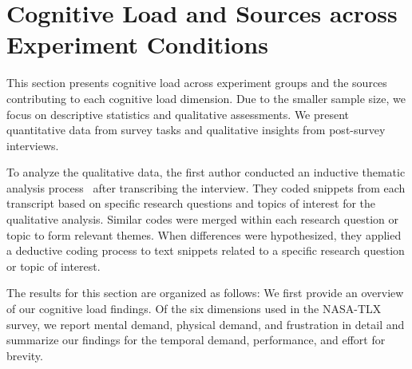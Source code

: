 \section{Cognitive Load and Sources across Experiment Conditions}
\label{sec:cog_result}
This section presents cognitive load across experiment groups and the sources contributing to each cognitive load dimension. Due to the smaller sample size, we focus on descriptive statistics and qualitative assessments. We present quantitative data from survey tasks and qualitative insights from post-survey interviews.

To analyze the qualitative data, the first author conducted an inductive thematic analysis process~\cite{olsonWaysKnowingHCI2014} after transcribing the interview. They coded snippets from each transcript based on specific research questions and topics of interest for the qualitative analysis. Similar codes were merged within each research question or topic to form relevant themes. When differences were hypothesized, they applied a deductive coding process to text snippets related to a specific research question or topic of interest.

The results for this section are organized as follows: We first provide an overview of our cognitive load findings. Of the six dimensions used in the NASA-TLX survey, we report mental demand, physical demand, and frustration in detail and summarize our findings for the temporal demand, performance, and effort for brevity.


